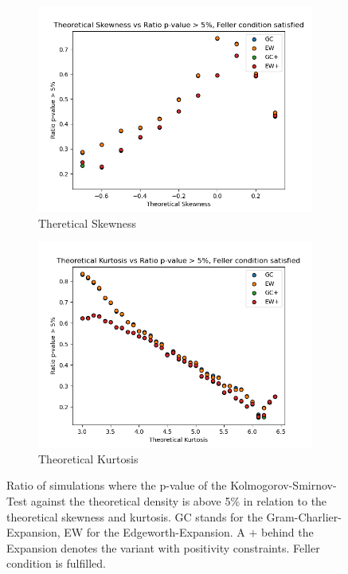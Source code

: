 \begin{figure}
    \centering
    \begin{subfigure}[b]{0.4\textwidth}
        \centering
        \includegraphics[width=\textwidth]{img/theoretical_skewness_vs_ratio_gc_ew_feller_condition_true.png}
        \caption{Theretical Skewness}
    \end{subfigure}
    \hfill
    \begin{subfigure}[b]{0.4\textwidth}
        \centering
        \includegraphics[width=\textwidth]{img/theoretical_kurtosis_vs_ratio_gc_ew_feller_condition_true.png}
        \caption{Theoretical Kurtosis}
    \end{subfigure}
    \caption{Ratio of simulations where the p-value of the Kolmogorov-Smirnov-Test against the theoretical density is above 5\% in relation to the theoretical skewness and kurtosis. GC stands for the Gram-Charlier-Expansion, EW for the Edgeworth-Expansion. A $+$ behind the Expansion denotes the variant with positivity constraints. Feller condition is fulfilled.}
    \label{fig:gc_vs_ew_theoretical_skewness_kurtosis}
\end{figure}

